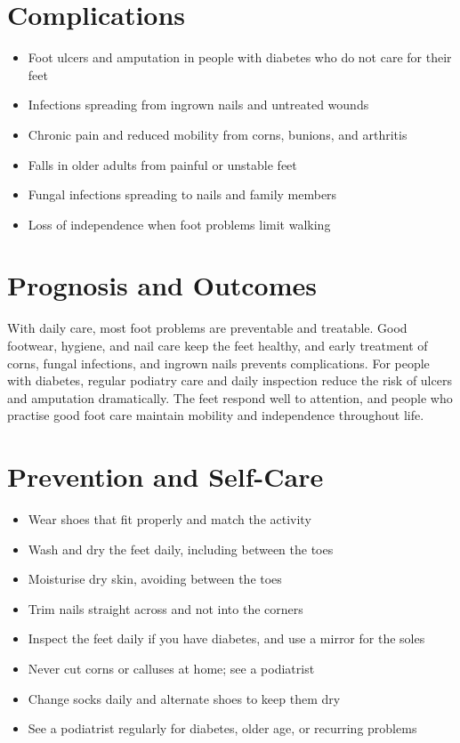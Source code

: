 \section*{Complications}
\begin{itemize}
    \item Foot ulcers and amputation in people with diabetes who do not care for their feet
    \item Infections spreading from ingrown nails and untreated wounds
    \item Chronic pain and reduced mobility from corns, bunions, and arthritis
    \item Falls in older adults from painful or unstable feet
    \item Fungal infections spreading to nails and family members
    \item Loss of independence when foot problems limit walking
\end{itemize}

\section*{Prognosis and Outcomes}
With daily care, most foot problems are preventable and treatable. Good footwear, hygiene, and nail care keep the feet healthy, and early treatment of corns, fungal infections, and ingrown nails prevents complications. For people with diabetes, regular podiatry care and daily inspection reduce the risk of ulcers and amputation dramatically. The feet respond well to attention, and people who practise good foot care maintain mobility and independence throughout life.

\section*{Prevention and Self-Care}
\begin{itemize}
    \item Wear shoes that fit properly and match the activity
    \item Wash and dry the feet daily, including between the toes
    \item Moisturise dry skin, avoiding between the toes
    \item Trim nails straight across and not into the corners
    \item Inspect the feet daily if you have diabetes, and use a mirror for the soles
    \item Never cut corns or calluses at home; see a podiatrist
    \item Change socks daily and alternate shoes to keep them dry
    \item See a podiatrist regularly for diabetes, older age, or recurring problems
\end{itemize}

